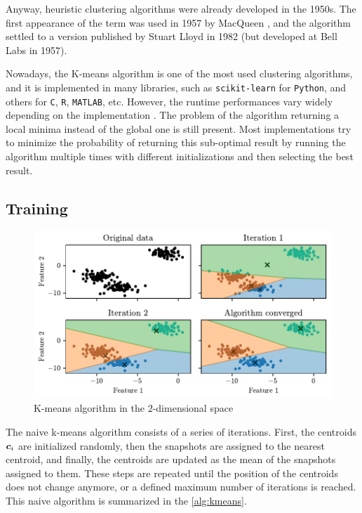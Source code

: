 Anyway, heuristic clustering algorithms were already developed in the 1950s. 
The first appearance of the term  was used in 1957 by MacQueen \cite{macqueen1967some}, and the algorithm settled to a  version  published by Stuart Lloyd in 1982 \cite{Lloyd1982} (but developed at Bell Labs in 1957).

Nowadays, the K-means algorithm is one of the most used clustering algorithms, and it is implemented in many libraries, such as \texttt{scikit-learn} for \texttt{Python}, and others for \texttt{C}, \texttt{R}, \texttt{MATLAB}, etc. However, the runtime performances vary widely depending on the implementation \cite{Kmeans-performances-Kriegel2017}. The problem of the algorithm returning a local minima instead of the global one is still present. Most implementations try to minimize the probability of returning this sub-optimal result by running the algorithm multiple times with different initializations and then selecting the best result.

\subsection{Training}

\begin{figure}[htbp]
  \centering
  \includegraphics[width=\textwidth]{images/Kmeans_vornoi.pdf}
  \caption{K-means algorithm in the $2$-dimensional space}
  \label{fig:kmeans_vornoi}
\end{figure}

 The naive k-means algorithm consists of a series of iterations. First, the centroids $\bm{c}_i$ are initialized randomly, then the snapshots are assigned to the nearest centroid, and finally, the centroids are updated as the mean of the snapshots assigned to them. These steps are repeated until the position of the centroids does not change anymore, or a defined maximum number of iterations is reached. This naive algorithm is summarized in the \autoref{alg:kmeans}.

